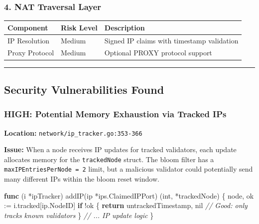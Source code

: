 \documentclass[
]{article}
\newenvironment{Shaded}{}{}
\newcommand{\CommentTok}[1]{\textcolor[rgb]{0.38,0.63,0.69}{\textit{#1}}}
\newcommand{\ControlFlowTok}[1]{\textcolor[rgb]{0.00,0.44,0.13}{\textbf{#1}}}
\newcommand{\DataTypeTok}[1]{\textcolor[rgb]{0.56,0.13,0.00}{#1}}
\newcommand{\KeywordTok}[1]{\textcolor[rgb]{0.00,0.44,0.13}{\textbf{#1}}}
\newcommand{\NormalTok}[1]{#1}
\newcommand{\OperatorTok}[1]{\textcolor[rgb]{0.40,0.40,0.40}{#1}}
\newcommand{\OtherTok}[1]{\textcolor[rgb]{0.00,0.44,0.13}{#1}}
\newcounter{none} %
\begin{document}
\subsubsection{4. NAT Traversal Layer}\label{4-nat-traversal-layer}

{\def\LTcaptype{none} %
\begin{longtable}[]{@{}lll@{}}
\toprule\noalign{}
Component & Risk Level & Description \\
\midrule\noalign{}
\endhead
\bottomrule\noalign{}
\endlastfoot
IP Resolution & Medium & Signed IP claims with timestamp validation \\
Proxy Protocol & Medium & Optional PROXY protocol support \\
\end{longtable}
}

\begin{center}\rule{0.5\linewidth}{0.5pt}\end{center}

\subsection{Security Vulnerabilities
Found}\label{security-vulnerabilities-found}

\subsubsection{HIGH: Potential Memory Exhaustion via Tracked
IPs}\label{high-potential-memory-exhaustion-via-tracked-ips}

\textbf{Location:} \texttt{network/ip\_tracker.go:353-366}

\textbf{Issue:} When a node receives IP updates for tracked validators,
each update allocates memory for the \texttt{trackedNode} struct. The
bloom filter has a \texttt{maxIPEntriesPerNode\ =\ 2} limit, but a
malicious validator could potentially send many different IPs within the
bloom reset window.

\begin{Shaded}
\begin{Highlighting}[]
\KeywordTok{func} \OperatorTok{(}\NormalTok{i }\OperatorTok{*}\NormalTok{ipTracker}\OperatorTok{)}\NormalTok{ addIP}\OperatorTok{(}\NormalTok{ip }\OperatorTok{*}\NormalTok{ips}\OperatorTok{.}\NormalTok{ClaimedIPPort}\OperatorTok{)} \OperatorTok{(}\DataTypeTok{int}\OperatorTok{,} \OperatorTok{*}\NormalTok{trackedNode}\OperatorTok{)} \OperatorTok{\{}
\NormalTok{    node}\OperatorTok{,}\NormalTok{ ok }\OperatorTok{:=}\NormalTok{ i}\OperatorTok{.}\NormalTok{tracked}\OperatorTok{[}\NormalTok{ip}\OperatorTok{.}\NormalTok{NodeID}\OperatorTok{]}
    \ControlFlowTok{if} \OperatorTok{!}\NormalTok{ok }\OperatorTok{\{}
        \ControlFlowTok{return}\NormalTok{ untrackedTimestamp}\OperatorTok{,} \OtherTok{nil}  \CommentTok{// Good: only tracks known validators}
    \OperatorTok{\}}
    \CommentTok{// ... IP update logic}
\OperatorTok{\}}
\end{Highlighting}
\end{Shaded}
\end{document}
